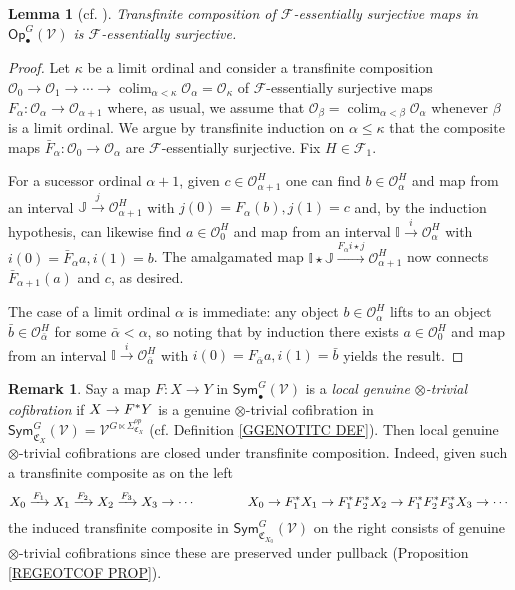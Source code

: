 \documentclass[a4paper,10pt
,draft
]{article}%
\numberwithin{equation}{section}
\numberwithin{figure}{section}
\newtheorem{lemma}[equation]{Lemma}%
\theoremstyle{definition} %
\newtheorem{remark}[equation]{Remark}%
\newcommand{\Op}{\mathsf{Op}}%
\DeclareMathOperator{\colim}{colim}%
\newcommand{\F}{\ensuremath{\mathcal F}}
\newcommand{\V}{\ensuremath{\mathcal V}}
\renewcommand{\O}{\ensuremath{\mathcal O}}
\newcommand{\1}{\ensuremath{\mathbbm 1}}%
\begin{document}
\begin{lemma}[cf. {\cite[4.17]{Cav}}] \label{TRANSCOMP_ES_LEM}
	Transfinite composition of $\F$-essentially surjective maps in $\Op^G_\bullet(\V)$ is $\F$-essentially surjective.
\end{lemma}



\begin{proof}
Let $\kappa$ be a limit ordinal and consider a transfinite composition
$\O_0 \to \O_1 \to \cdots 
\to \colim_{\alpha < \kappa} \O_{\alpha} = \O_{\kappa}$
of $\F$-essentially surjective maps
$F_{\alpha} \colon \O_{\alpha} \to \O_{\alpha +1}$ where, as usual, 
we assume that $\O_{\beta} = \colim_{\alpha < \beta} \O_{\alpha}$ whenever $\beta$ is a limit ordinal.
We argue by transfinite induction on $\alpha \leq \kappa$
that the composite maps $\bar{F}_{\alpha} \colon \O_0 \to \O_{\alpha}$
are $\F$-essentially surjective. Fix $H \in \F_1$.

For a sucessor ordinal $\alpha+1$, given $c \in \O_{\alpha+1}^H$
one can find $b \in \O_\alpha^H$ and map from an interval 
$\mathbb{J} \xrightarrow{j} \O_{\alpha+1}^H$ with $j(0) = F_{\alpha}(b),j(1)=c$
and, by the induction hypothesis, can likewise find
$a \in \O_0^H$ and map from an interval $\mathbb{I} \xrightarrow{i} \O_\alpha^H$
with $i(0)=\bar{F}_{\alpha}a,i(1)=b$.
The amalgamated map
$\mathbb{I} \star \mathbb{J} \xrightarrow{F_{\alpha}i \star j} \O_{\alpha+1}^H$
now connects $\bar{F}_{\alpha+1}(a)$ and $c$, as desired.

The case of a limit ordinal $\alpha$ is immediate: any object $b \in \O_{\alpha}^H$
lifts to an object $\bar{b} \in \O_{\bar{\alpha}}^H$ for some $\bar{\alpha} < \alpha$,
so noting that by induction there exists $a \in \O_0^H$ and map from an interval $\mathbb{I} \xrightarrow{i} \O_{\bar{\alpha}}^H$
with $i(0) = F_{\bar{\alpha}}a,i(1) = \bar{b}$ yields the result.
\end{proof}



\begin{remark}\label{LOCOTIMESTRI REM}
	Say a map $F \colon X \to Y$ in 
	$\mathsf{Sym}^{G}_{\bullet}(\V)$
	is a \emph{local genuine $\otimes$-trivial cofibration}
	if  
	$X \to F^{\**}Y$ is a 
	genuine $\otimes$-trivial cofibration in 
	$\mathsf{Sym}^{G}_{\mathfrak{C}_X}(\V) = \V^{G \ltimes \Sigma^{op}_{\mathfrak{C}_{X}}}$
	(cf. Definition \ref{GGENOTITC DEF}).
Then local genuine $\otimes$-trivial cofibrations are closed under transfinite composition.
Indeed, given such a transfinite composite as on the left
\[
X_0 \xrightarrow{F_1} 
X_1 \xrightarrow{F_2}
X_2 \xrightarrow{F_3}
X_3 \to \cdots 
\qquad \qquad 
X_0 \to  
F_1^{\**} X_1 \to
F_1^{\**}F_2^{\**}X_2 \to
F_1^{\**}F_2^{\**}F_3^{\**}X_3 \to \cdots 
\]
the induced transfinite composite in $\mathsf{Sym}^{G}_{\mathfrak{C}_{X_0}}(\V)$
on the right consists of 
genuine $\otimes$-trivial cofibrations
since these are preserved under pullback
(Proposition \ref{REGEOTCOF PROP}).
\end{remark}
\end{document}
